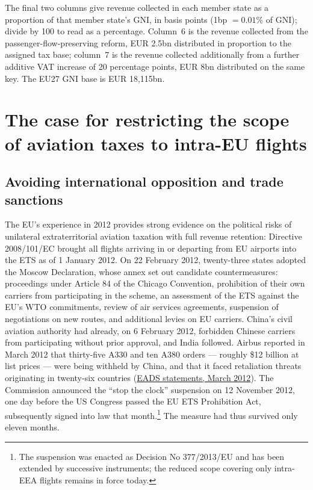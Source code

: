 \documentclass[../../main]{subfiles}
\begin{document}
\begin{table}[htbp]
\begin{minipage}{\textwidth}
The final two columns give revenue collected in each member state as a
proportion of that member state's GNI, in basis points (1bp $=0.01\%$ of GNI);
divide by 100 to read as a percentage. Column~6 is the revenue collected from
the passenger-flow-preserving reform, EUR 2.5bn distributed in proportion to
the assigned tax base; column~7 is the revenue collected additionally from a
further additive VAT increase of 20 percentage points, EUR 8bn distributed on
the same key. The EU27 GNI base is EUR 18,115bn.
\end{minipage}
\end{table}


\section{The case for restricting the scope of aviation taxes to intra-EU flights }

\subsection{Avoiding international opposition and trade sanctions}

The EU's experience in 2012 provides strong evidence on the political risks of unilateral extraterritorial aviation taxation with full revenue retention:  Directive 2008/101/EC brought all flights arriving in or departing from EU airports into the ETS as of 1 January 2012. On 22 February 2012, twenty-three states adopted the Moscow Declaration, whose annex set out candidate countermeasures: proceedings under Article 84 of the Chicago Convention, prohibition of their own carriers from participating in the scheme, an assessment of the ETS against the EU's WTO commitments, review of air services agreements, suspension of negotiations on new routes, and additional levies on EU carriers. China's civil aviation authority had already, on 6 February 2012, forbidden Chinese carriers from participating without prior approval, and India followed. Airbus reported in March 2012 that thirty-five A330 and ten A380 orders --- roughly \$12 billion at list prices --- were being withheld by China, and that it faced retaliation threats originating in twenty-six countries (\href{https://www.aljazeera.com/economy/2012/3/9/eu-china-dispute-delaying-airbus-orders}{EADS statements, March 2012}). The Commission announced the ``stop the clock'' suspension on 12 November 2012, one day before the US Congress passed the EU ETS Prohibition Act, subsequently signed into law that month.\footnote{The suspension was enacted as Decision No 377/2013/EU and has been extended by successive instruments; the reduced scope covering only intra-EEA flights remains in force today. } The measure had thus survived only eleven months.
\end{document}
